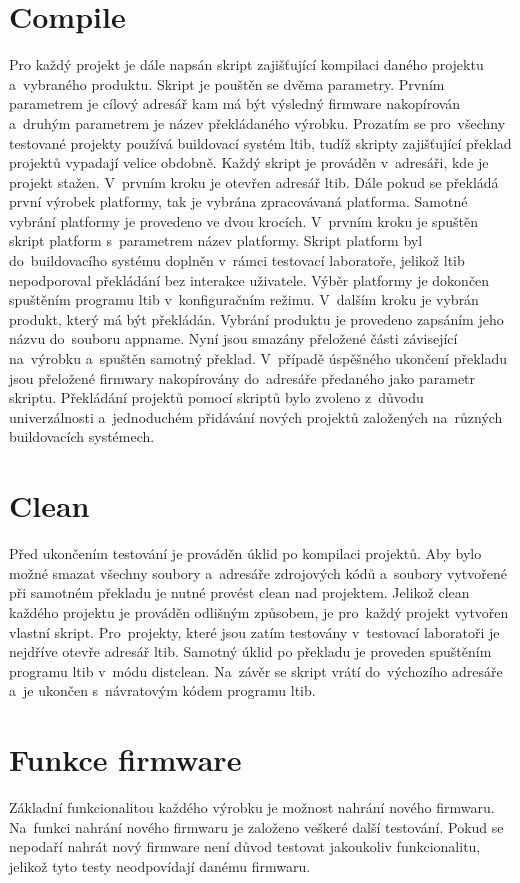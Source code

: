 \section{Compile}
Pro každý projekt je dále napsán skript zajišťující kompilaci daného projektu a~vybraného produktu. Skript je pouštěn se dvěma parametry. Prvním parametrem je cílový adresář kam má být výsledný firmware nakopírován a~druhým parametrem je název překládaného výrobku. Prozatím se pro~všechny testované projekty používá buildovací systém ltib, tudíž skripty zajišťující překlad projektů vypadají velice obdobně. Každý skript je prováděn v~adresáři, kde je projekt stažen. V~prvním kroku je otevřen adresář ltib. Dále pokud se překládá první výrobek platformy, tak je vybrána zpracovávaná platforma. Samotné vybrání platformy je provedeno ve dvou krocích. V~prvním kroku je spuštěn skript platform s~parametrem název platformy. Skript platform byl do~buildovacího systému doplněn v~rámci testovací laboratoře, jelikož ltib nepodporoval překládání bez interakce uživatele. Výběr platformy je dokončen spuštěním programu ltib v~konfiguračním režimu. V~dalším kroku je vybrán produkt, který má být překládán. Vybrání produktu je provedeno zapsáním jeho názvu do~souboru appname. Nyní jsou smazány přeložené části závisející na~výrobku a~spuštěn samotný překlad. V~případě úspěšného ukončení překladu jsou přeložené firmwary nakopírovány do~adresáře předaného jako parametr skriptu. Překládání projektů pomocí skriptů bylo zvoleno z~důvodu univerzálnosti a~jednoduchém přidávání nových projektů založených na~různých buildovacích systémech.

\section{Clean}
Před ukončením testování je prováděn úklid po kompilaci projektů. Aby bylo možné smazat všechny soubory a~adresáře zdrojových kódů a~soubory vytvořené při samotném překladu je nutné provést clean nad projektem. Jelikož clean každého projektu je prováděn odlišným způsobem, je pro~každý projekt vytvořen vlastní skript. Pro~projekty, které jsou zatím testovány v~testovací laboratoři je nejdříve otevře adresář ltib. Samotný úklid po překladu je proveden spuštěním programu ltib v~módu distclean. Na~závěr se skript vrátí do~výchozího adresáře a~je ukončen s~návratovým kódem programu ltib.

\section{Funkce firmware}
Základní funkcionalitou každého výrobku je možnost nahrání nového firmwaru. Na~funkci nahrání nového firmwaru je založeno veškeré další testování. Pokud se nepodaří nahrát nový firmware není důvod testovat jakoukoliv funkcionalitu, jelikož tyto testy neodpovídají danému firmwaru. \cite{confv2} \cite{confv3}

